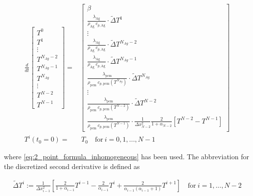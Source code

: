 \documentclass{scrartcl}[12pt, halfparskip]
\numberwithin{equation}{section}
\numberwithin{figure}{section}
\numberwithin{table}{section}
\begin{document}
\begin{align}
\frac{d}{dt} \begin{bmatrix*}
T^0 \\[1ex]
T^1 \\[0.3ex]
\vdots \\[1ex]
T^{N_{Ag}-2} \\[1.9ex]
T^{N_{Ag}-1} \\[1.9ex]
T^{N_{Ag}} \\[0.5ex]
\vdots \\[1.5ex]
T^{N-2} \\[1ex]
T^{N-1}
\end{bmatrix*} = &
\begin{bmatrix}
\beta \\
\frac{\lambda_{\text{Ag}}}{\rho_{\text{Ag}} \ c_{p,\text{Ag}}} \cdot \tilde{\Delta} T^1 \\[0.7ex]
\vdots \\[0.3ex]
\frac{\lambda_{\text{Ag}}}{\rho_{\text{Ag}} \ c_{p,\text{Ag}}} \cdot \tilde{\Delta} T^{N_{Ag}-2} \\[1.5ex]
\frac{\lambda_{\text{Ag}}}{\rho_{\text{Ag}} \ c_{p,\text{Ag}}} \cdot \tilde{\Delta} T^{N_{Ag}-1} \\[1.5ex]
\frac{\lambda_{\text{pcm}}}{\rho_{\text{pcm}} \ c_{p,{\text{pcm}}}(T^{N_{Ag}})} \cdot \tilde{\Delta} T^{N_{Ag}} \\[0.5ex]
\vdots \\[0.5ex]
\frac{\lambda_{\text{pcm}}}{\rho_{\text{pcm}} \ c_{p,{\text{pcm}}}(T^{N-2})} \cdot \tilde{\Delta} T^{N-2} \\[0.5ex]
\frac{\lambda_{\text{pcm}}}{\rho_{\text{pcm}} \ c_{p,\text{pcm}}(T^{N-1})} \cdot \frac{1}{\Delta x_{N-2}^2} \frac{2}{1 + \alpha_{N-2}} [T^{N-2} - T^{N-1}]
\end{bmatrix} \label{eq:heat_equation_discretized} \\[2ex]
T^i(t_0=0) = & \ T_0 \quad \text{for} \ i = 0,1,...,N-1 \nonumber
\end{align}

where \cref{eq:2_point_formula_inhomogeneous} has been used. The abbreviation for the discretized second derivative is defined as

\begin{align}
	\tilde{\Delta} T^i := \frac{1}{\Delta x_{i-1}^2} \left[ \frac{2}{1+\alpha_{i-1}} T^{i-1} - \frac{2}{\alpha_{i-1}} T^{i} + \frac{2}{\alpha_{i-1} (\alpha_{i-1} + 1)} T^{i+1} \right]  \quad \text{for} \ i=1,...,N-2
\end{align}
\end{document}
